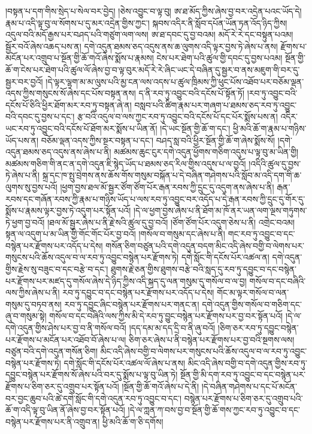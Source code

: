 །བསྟན་པ་དག་གིས་སྲེད་པ་སེལ་བར་བྱེད། །ཅེས་འབྱུང་བ་ལྟ་བུ། ཨ་ཐ་མོད་ཀྱིས་ཞེས་བྱ་བར་འདྲེན་པའང་ཡོད་དེ། རྣམ་པ་འདི་ལྟ་བུ་ལ་སོགས་པ་དུ་མར་འདྲེན་གྱིས་ཀྱང་། སྐབས་འདིར་ནི་སློབ་དཔོན་ཡོན་ཏན་འོད་ཉིད་ཀྱིས། འདུལ་བའི་མདོ་རྒྱས་པར་བཤད་པའི་གཙུག་ལག་ལས། ཨ་ཐ་དབང་དུ་བྱ་བའམ། མདོ་རེ་རེ་དང་བསྟུན་པའམ། སྦྱོར་བའོ་ཞེས་འཆད་པས་ན། དགེ་འདུན་ཐམས་ཅད་འདུས་ནས་ཆ་ལུགས་འདི་ལྟར་བྱས་ཏེ་ཞེས་པ་ནས། རྫོགས་པ་མངོན་པར་འགྲུབ་པ་སྔོན་གྱི་ཆོ་གའོ་ཞེས་སྨོས་པ་རྣམས། ངེས་པར་ཐེག་པའི་ཚུལ་གྱི་དབང་དུ་བྱས་པའམ། སྔོན་གྱི་ཆོ་ག་ངེས་པར་ཐེག་པའི་ཚུལ་ལོ་ཞེས་བྱ་བ་ལྟ་བུར་མདོ་རེ་རེ་ཞིང་ཡང་དེ་བཞིན་དུ་སྦྱར་བ་ནས་མཇུག་གི་བར་དུ་སྦྱར་བར་བྱའོ། །དེ་ལྟར་ལྷག་མ་མ་ལུས་པའི་མྱ་ངན་ལས་འདས་པ་ཚུལ་ཁྲིམས་ཀྱི་ཕུང་པོས་འཐོབ་པར་བཅོམ་ལྡན་འདས་ཀྱིས་གསུངས་སོ་ཞེས་དང་པོས་བསྟན་ནས། ད་ནི་རབ་ཏུ་འབྱུང་བའི་དངོས་པོ་སྟོན་ཏོ། །རབ་ཏུ་འབྱུང་བའི་དངོས་པོ་ཅིའི་ཕྱིར་ཐོག་མར་རབ་ཏུ་བསྟན་ཞེ་ན། བསླབ་པའི་ཚིག་རྣམ་པར་གཞག་པ་ཐམས་ཅད་རབ་ཏུ་འབྱུང་བའི་དབང་དུ་བྱས་པ་དང་། རྩ་བའི་འདུལ་བ་ལས་ཀྱང་རབ་ཏུ་འབྱུང་བའི་དངོས་པོ་དང་པོར་སྨོས་པས་ན། འདིར་ཡང་རབ་ཏུ་འབྱུང་བའི་དངོས་པོ་ཐོག་མར་སྨོས་པ་ཡིན་ནོ། །དེ་ཡང་སྔོན་གྱི་ཆོ་ག་དང་། ཕྱི་མའི་ཆོ་ག་རྣམ་པ་གཉིས་ཡོད་པས་ན། བཅོམ་ལྡན་འདས་ཀྱིས་སྔར་བསྟན་པ་དང་། བཤད་སླ་བའི་ཕྱིར་སྔོན་གྱི་ཆོ་ག་ཞེས་སྨོས་སོ། །དགེ་འདུན་ཐམས་ཅད་འདུས་ནས་ཞེས་པ་ནི། མཚམས་ཆུང་ངུར་དགེ་འདུན་ཕྱོགས་གཅིག་འདུས་པ་ལྟ་བུ་མ་ཡིན་གྱི། མཚམས་གཅིག་གི་ནང་ན་དགེ་འདུན་ཇི་སྙེད་ཡོད་པ་ཐམས་ཅད་རིལ་གྱིས་འདུས་པ་ལ་བྱའོ། །འདིའི་ཚུལ་དུ་བྱས་ཏེ་ཞེས་པ་ནི། སྐྲ་དང་ཁ་སྤུ་བྲེགས་ནས་ཆོས་གོས་གསུམ་བསྐོན་པ་དེ་བཞིན་གཤེགས་པའི་སློབ་མ་འདི་དག་གི་ཆ་ལུགས་སུ་བྱས་པའོ། །ཕྱག་བྱས་ཐལ་མོ་སྦྱར་ཙོག་ཙོག་པོར་རྒན་རབས་ཀྱི་དྲུང་དུ་འདུག་ནས་ཞེས་པ་ནི། རྒན་རབས་དང་གཞོན་རབས་ཀྱི་རྣམ་པ་གཉིས་ཡོད་པ་ལས་རབ་ཏུ་འབྱུང་བར་འདོད་པ་དེ་རྒན་རབས་ཀྱི་དྲུང་དུ་གོར་དུ་སྨོས་པ་རྣམས་ལྟར་བྱས་ཏེ་འདུག་པར་སྟོན་པའོ། །དེ་ལ་ཕྱག་བྱས་ཞེས་པ་ནི་ཐོག་མ་ཁོ་ནར་ཡན་ལག་ལྔས་གཏུགས་ཏེ་ཕྱག་བྱ་བའོ། །ཐལ་མོ་སྦྱར་ཞེས་པ་ནི་རྗེ་སའི་ཚུལ་དུ་བྱ་བའོ། །ཙོག་ཙོག་པོར་འདུག་ཅེས་པ་ནི། འགྲེང་བའམ། སྟན་ལ་འདུག་པ་མ་ཡིན་གྱི་གོང་གོང་པོར་བྱ་བའོ། །གསོལ་བ་གསུམ་དང་ཞེས་པ་ནི། གང་རབ་ཏུ་འབྱུང་བ་དང་བསྙེན་པར་རྫོགས་པར་འདོད་པ་དེས། གསོན་ཅིག་བཙུན་པའི་དགེ་འདུན་བདག་མིང་འདི་ཞེས་བགྱི་བ་ལེགས་པར་གསུངས་པའི་ཆོས་འདུལ་བ་ལ་རབ་ཏུ་འབྱུང་བསྙེན་པར་རྫོགས་ཏེ། དགེ་སློང་གི་དངོས་པོར་འཚལ་ན། དགེ་འདུན་གྱིས་རྗེས་སུ་བཟུང་བ་དང་བརྩེ་བ་དང་། ཐུགས་རྗེ་ཅན་གྱིས་ཐུགས་བརྩེ་བའི་སླད་དུ་རབ་ཏུ་དབྱུང་བ་དང་བསྙེན་པར་རྫོགས་པར་མཛད་དུ་གསོལ་ཞེས་དེ་ཉིད་ཀྱིས་འདི་སྐད་དུ་ལན་གསུམ་དུ་གསོལ་བ་ལ་བྱ། གསོལ་བ་དང་བཞིའི་ལས་ཀྱིས་ཞེས་པ་ནི། རབ་ཏུ་དབྱུང་བ་དང་བསྙེན་པར་རྫོགས་པར་འདོད་པ་དེས། གོང་མ་ལྟར་གསོལ་བ་ལན་གསུམ་དུ་བཏབ་ནས། རབ་ཏུ་དབྱུང་ཞིང་བསྙེན་པར་རྫོགས་པར་གནང་ན། དགེ་འདུན་གྱིས་གསོལ་བ་གཅིག་དང་ཞུ་བ་གསུམ་སྟེ། གསོལ་བ་དང་བཞིའི་ལས་ཀྱིས་མི་དེ་རབ་ཏུ་བྱུང་བསྙེན་པར་རྫོགས་པར་བྱ་བར་སྟོན་པའོ། །དེ་ལ་དགེ་འདུན་གྱིས་ཤེས་པར་བྱ་བ་ནི་གསོལ་བའོ། །དད་དམ་མ་དད་དྲི་བ་ནི་ཞུ་བའོ། །ཅིག་ཅར་རབ་ཏུ་དབྱུང་བསྙེན་པར་རྫོགས་པ་མངོན་པར་འཐོབ་བོ་ཞེས་པ་ལ། ཅིག་ཅར་ཞེས་པ་ནི་བསྙེན་པར་རྫོགས་པར་བྱ་བའི་སྔགས་ལས། བཙུན་བའི་དགེ་འདུན་གསོན་ཅིག། མིང་འདི་ཞེས་བགྱི་བ་ལེགས་པར་གསུངས་པའི་ཆོས་འདུལ་བ་ལ་རབ་ཏུ་འབྱུང་བསྙེན་པར་རྫོགས་ཏེ། དགེ་སློང་གི་དངོས་པོར་འཚལ་ལོ་ཞེས་པ་ནས། མིང་འདི་ཞེས་བགྱི་བ་དགེ་འདུན་གྱིས་རབ་ཏུ་དབྱུང་བསྙེན་པར་རྫོགས་སོ་ཞེས་པའི་བར་དུ་སྨོས་པ་ལྟ་བུ་ཡིན་ཏེ། སྔོན་གྱི་མི་དག་རབ་ཏུ་འབྱུང་བ་དང་བསྙེན་པར་རྫོགས་པ་ཅིག་ཅར་དུ་འགྲུབ་པར་སྟོན་པའོ། །སྔོན་གྱི་ཆོ་གའོ་ཞེས་པ་དེ་ནི། །དེ་བཞིན་གཤེགས་པ་དང་པོ་མངོན་བར་བྱང་ཆུབ་པའི་ཚེ་དགེ་སློང་གི་དགེ་འདུན་རབ་ཏུ་འབྱུང་བ་དང་། བསྙེན་པར་རྫོགས་པ་ཅིག་ཅར་དུ་འགྲུབ་པའི་ཆོ་ག་འདི་ལྟ་བུ་ཡིན་ནོ་ཞེས་བྱ་བར་སྟོན་པའོ། །དེ་ལ་ཀླན་ཀ་བས་བྱ་བ་སྔོན་གྱི་ཆོ་གས་ཀྱང་རབ་ཏུ་འབྱུང་བ་དང་བསྙེན་པར་རྫོགས་པར་ནི་འགྲུབ་ན། ཕྱི་མའི་ཆོ་ག་ཅི་དགོས། 